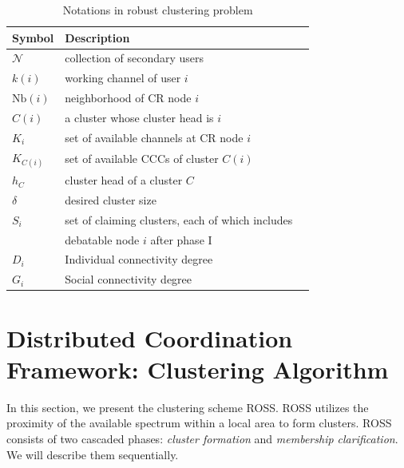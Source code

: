 \documentclass[10pt,journal,compsoc]{IEEEtran}
\theoremstyle{mytheoremstyle}
\theoremstyle{mytheoremstyle}
\theoremstyle{mytheoremstyle}
\begin{document}


\begin{table}[h!]
\caption{Notations in robust clustering problem}
\label{tab1}
\centering
\begin{tabular}{llr}
\toprule
Symbol & Description \\
\midrule
$\mathcal{N}$  & collection of secondary users\\
$k(i)$ & working channel of user $i$\\
$\text{Nb}(i)$ & neighborhood of CR node $i$    \\
$C(i)$ & a cluster whose cluster head is $i$  \\
$K_i$   & set of available channels at CR node $i$  \\
$K_{C(i)}$   & set of available CCCs of cluster $C(i)$ \\
$h_C$ & cluster head of a cluster $C$\\
$\delta$ & desired cluster size\\
$S_i$ & set of claiming clusters, each of which includes \\
& debatable node $i$ after phase I\\
$D_i$  & Individual connectivity degree \\
$G_i$  & Social connectivity degree \\
\bottomrule
\end{tabular}
\end{table}




\section{Distributed Coordination Framework: Clustering Algorithm}
\label{ross}

In this section, we present the clustering scheme ROSS.
ROSS utilizes the proximity of the available spectrum within a local area to form clusters.
ROSS consists of two cascaded phases: \textit{cluster formation} and \textit{membership clarification}.
We will describe them sequentially.
\end{document}
